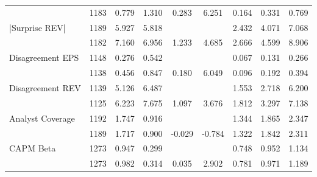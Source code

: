 \begin{tabular}{l*{8}{c}}
&        1183&       0.779&       1.310&       0.283&       6.251&       0.164&       0.331&       0.769\\
|Surprise REV|&        1189&       5.927&       5.818&           &           &       2.432&       4.071&       7.068\\
&        1182&       7.160&       6.956&       1.233&       4.685&       2.666&       4.599&       8.906\\
Disagreement EPS&        1148&       0.276&       0.542&           &           &       0.067&       0.131&       0.266\\
&        1138&       0.456&       0.847&       0.180&       6.049&       0.096&       0.192&       0.394\\
Disagreement REV&        1139&       5.126&       6.487&           &           &       1.553&       2.718&       6.200\\
&        1125&       6.223&       7.675&       1.097&       3.676&       1.812&       3.297&       7.138\\
Analyst Coverage    &        1192&       1.747&       0.916&           &           &       1.344&       1.865&       2.347\\
     &        1189&       1.717&       0.900&      -0.029&      -0.784&       1.322&       1.842&       2.311\\
CAPM Beta       &        1273&       0.947&       0.299&           &           &       0.748&       0.952&       1.134\\
       &        1273&       0.982&       0.314&       0.035&       2.902&       0.781&       0.971&       1.189\\
\bottomrule
\end{tabular}
